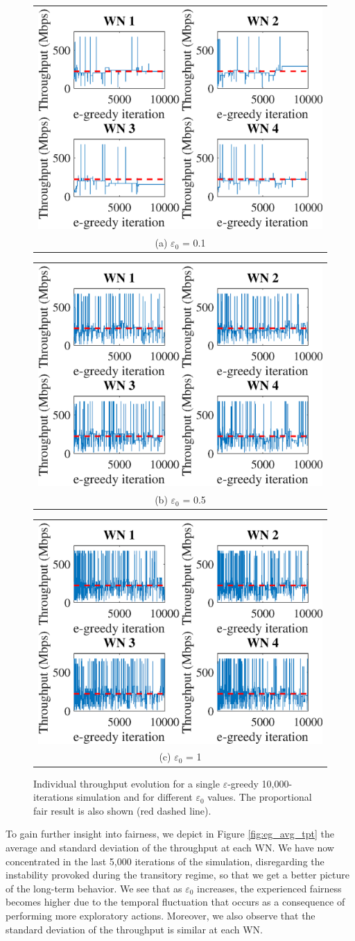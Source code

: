 \documentclass[preprint,12pt]{elsarticle}
\begin{document}
\begin{figure}
	\centering
	\begin{tabular}{@{}c@{}}
		\includegraphics[width=.3\textwidth]{images/NEW_temporal_individual_tpt_e-greedy_e01} \\[\abovecaptionskip]
		\small (a) $\varepsilon_0$ = 0.1
		\label{fig:eg_e01_ind_tpt}
	\end{tabular}	
	\hspace{\floatsep}	
	\begin{tabular}{@{}c@{}}
		\includegraphics[width=.3\textwidth]{images/NEW_temporal_individual_tpt_e-greedy_e05} \\[\abovecaptionskip]
		\small (b) $\varepsilon_0$ = 0.5
		\label{fig:eg_e05_ind_tpt}
	\end{tabular}
	\hspace{\floatsep}
	\begin{tabular}{@{}c@{}}
		\includegraphics[width=.3\textwidth]{images/NEW_temporal_individual_tpt_e-greedy_e1} \\[\abovecaptionskip]
		\small (c) $\varepsilon_0$ = 1
		\label{fig:eg_e1_ind_tpt}
	\end{tabular}
	\caption{Individual throughput evolution for a single $\varepsilon$-greedy 10,000-iterations simulation and for different $\varepsilon_0$ values. The proportional fair result is also shown (red dashed line).}
	\label{fig:eg_ind_tpt}
\end{figure}

To gain further insight into fairness, we depict in Figure \ref{fig:eg_avg_tpt} the average  and standard deviation of the throughput at each WN. We have now concentrated in the last 5,000 iterations of the simulation, disregarding the instability provoked during the transitory regime, so that we get a better picture of the long-term behavior. We see that as $\varepsilon_0$ increases, the experienced fairness becomes higher due to the temporal fluctuation that occurs as a consequence of performing more exploratory actions. Moreover, we also observe that the standard deviation of the throughput is similar at each WN.  
\end{document}
